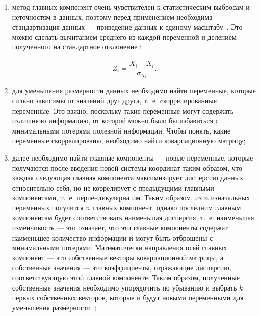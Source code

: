 \begin{enumerate}
	\item метод главных компонент очень чувствителен к статистическим выбросам и неточностям в данных, поэтому перед применением необходима стандартизация данных --- приведение данных к единому масштабу~\cite{polyak, zakaria}. Это можно сделать вычитанием среднего из каждой переменной и делением полученного на стандартное отклонение \cite{zakaria}:
	
	\begin{equation}\label{eq:normalization_Z1}
		Z_i = \frac{{X_i - \bar{X_i}}}{{\sigma_{X_i}}}.
	\end{equation}
	\item для уменьшения размерности данных необходимо найти переменные, которые сильно зависимы от значений друг друга, т.~е. cкоррелированные переменные. Это важно, поскольку такие переменные могут содержать излишнюю информацию, от которой можно было бы избавиться с минимальными потерями полезной информации. Чтобы понять, какие переменные скоррелированы, необходимо найти ковариационную матрицу;
	\item далее необходимо найти главные компоненты --- новые переменные, которые получаются после введения новой системы координат таким образом, что каждая следующая главная компонента максимизирует дисперсию данных относительно себя, но не коррелирует с предыдущими главными компонентами, т.~е. перпендикулярна им. Таким образом, из $n$ изначальных переменных получится $n$ главных компонент, однако последним главным компонентам будет соответствовать наименьшая дисперсия, т.~е. наименьшая изменчивость --- это означает, что эти главные компоненты содержат наименьшее количество информации и могут быть отброшены с минимальными потерями. Математически направления осей главных компонент --- это собственные векторы ковариационной матрицы, а собственные значения --- это коэффициенты, отражающие дисперсию, соответствующую этой главной компоненте. Таким образом, полученные собственные значения необходимо упорядочить по убыванию и выбрать $k$ первых собственных векторов, которые и будут новыми переменными для уменьшения размерности~\cite{orlov, polyak, zakaria};
	

\end{enumerate}
